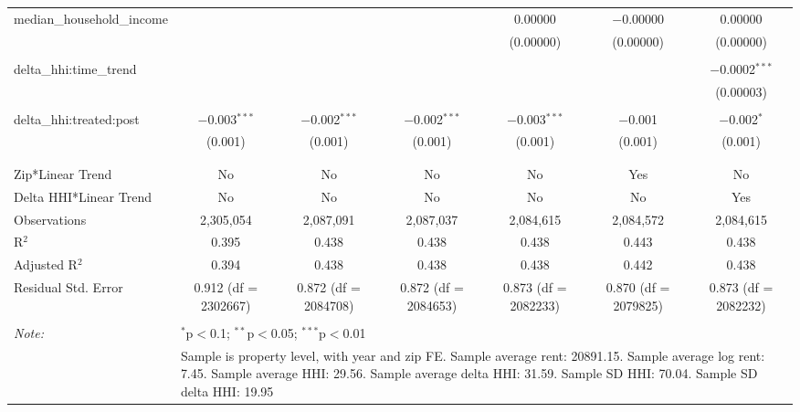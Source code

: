 \begin{table}[H]
{\begin{tabular}{@{\extracolsep{5pt}}lcccccc}
  median\_household\_income &  &  &  & 0.00000 & $-$0.00000 & 0.00000 \\  

   &  &  &  & (0.00000) & (0.00000) & (0.00000) \\  

   & & & & & & \\  

  delta\_hhi:time\_trend &  &  &  &  &  & $-$0.0002$^{***}$ \\  

   &  &  &  &  &  & (0.00003) \\  

   & & & & & & \\  

  delta\_hhi:treated:post & $-$0.003$^{***}$ & $-$0.002$^{***}$ & $-$0.002$^{***}$ & $-$0.003$^{***}$ & $-$0.001 & $-$0.002$^{*}$ \\  

   & (0.001) & (0.001) & (0.001) & (0.001) & (0.001) & (0.001) \\  

   & & & & & & \\  

 \hline \\[-1.8ex]  

 Zip*Linear Trend & No & No & No & No & Yes & No \\  

 Delta HHI*Linear Trend & No & No & No & No & No & Yes \\  

 Observations & 2,305,054 & 2,087,091 & 2,087,037 & 2,084,615 & 2,084,572 & 2,084,615 \\  

 R$^{2}$ & 0.395 & 0.438 & 0.438 & 0.438 & 0.443 & 0.438 \\  

 Adjusted R$^{2}$ & 0.394 & 0.438 & 0.438 & 0.438 & 0.442 & 0.438 \\  

 Residual Std. Error & 0.912 (df = 2302667) & 0.872 (df = 2084708) & 0.872 (df = 2084653) & 0.873 (df = 2082233) & 0.870 (df = 2079825) & 0.873 (df = 2082232) \\  

 \hline  

 \hline \\[-1.8ex]  

 \textit{Note:}  & \multicolumn{6}{l}{$^{*}$p$<$0.1; $^{**}$p$<$0.05; $^{***}$p$<$0.01} \\  

  & \multicolumn{6}{l}{Sample is property level, with year and zip FE. Sample average rent: 20891.15. Sample average log rent: 7.45. Sample average HHI: 29.56. Sample average delta HHI: 31.59. Sample SD HHI: 70.04. Sample SD delta HHI: 19.95} \\  

 \end{tabular}}  

 \end{table}  

